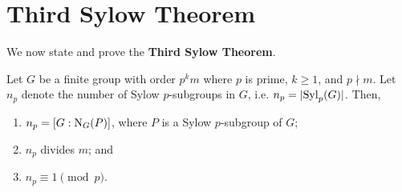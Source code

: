 \section{Third Sylow Theorem}
We now state and prove the \textbf{Third Sylow Theorem}.
\begin{theorem}\label{thrm-sylow-3}
    Let $G$ be a finite group with order $p^k m$ where $p$ is prime, $k \geq 1$, and $p \nmid m$. Let $n_p$ denote the number of Sylow $p$-subgroups in $G$, i.e. $n_p = |\mathrm{Syl}_{p}(G)|$. Then,
    \begin{enumerate}
        \item $n_p = [G:\mathrm{N}_{G}(P)]$, where $P$ is a Sylow $p$-subgroup of $G$;
        \item $n_p$ divides $m$; and
        \item $n_p \equiv 1 \pmod p$.
    \end{enumerate}
\end{theorem}
